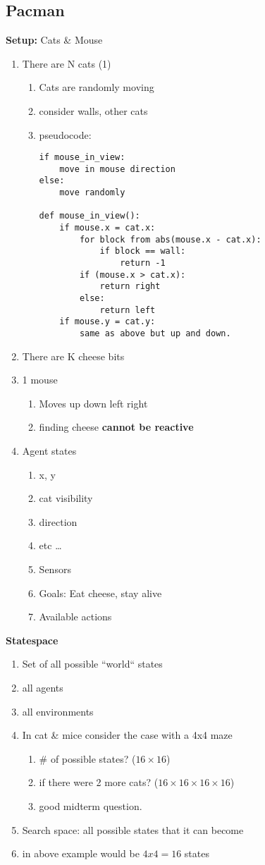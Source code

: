 \documentclass{article}
\begin{document}
\subsection{Pacman}
\textbf{Setup:} Cats \& Mouse
\begin{enumerate}
	\item There are N cats (1)
		\begin{enumerate}
			\item Cats are randomly moving
			\item consider walls, other cats
			\item pseudocode:
\newpage
\begin{lstlisting}
if mouse_in_view:
	move in mouse direction
else:
	move randomly

def mouse_in_view():
	if mouse.x = cat.x:
		for block from abs(mouse.x - cat.x):
			if block == wall:
				return -1
		if (mouse.x > cat.x):
			return right
		else:
			return left
	if mouse.y = cat.y:
		same as above but up and down.
\end{lstlisting}
		\end{enumerate}
	\item There are K cheese bits
	\item 1 mouse
		\begin{enumerate}
			\item Moves up down left right
			\item finding cheese \textbf{cannot be reactive}
		\end{enumerate}
	\item Agent states
		\begin{enumerate}
			\item x, y
			\item cat visibility
			\item direction
			\item etc \dots
			\item Sensors
			\item Goals: Eat cheese, stay alive
			\item Available actions
		\end{enumerate}
\end{enumerate}
\textbf{Statespace}
\begin{enumerate}
	\item Set of all possible ``world`` states
	\item all agents
	\item all environments
	\item In cat \& mice consider the case with a 4x4 maze
		\begin{enumerate}
			\item \# of possible states? ($16 \times 16$)
			\item if there were 2 more cats? ($16 \times 16 \times 16 \times 16$)
			\item good midterm question.
		\end{enumerate}
	\item Search space: all possible states that it can become
	\item in above example would be $4x4 = 16$ states
\end{enumerate}
\end{document}
